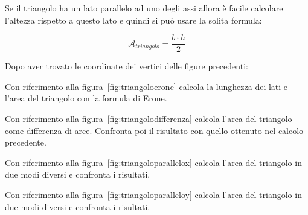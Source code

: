 Se il triangolo ha un lato parallelo ad uno degli assi allora è facile 
calcolare l'altezza rispetto a questo lato e quindi si può usare la 
solita formula:

\[\mathcal{A}_{triangolo} = \frac{b \cdot h}{2}\]

\begin{exrig}
 Dopo aver trovato le coordinate dei vertici delle figure precedenti:

 \begin{esempio}
 \label{ex:D.18}
  Con riferimento alla figura~\ref{fig:triangoloerone} calcola 
  la lunghezza dei lati e l'area del triangolo con la formula di Erone.
 \end{esempio}

 \begin{esempio}
  Con riferimento alla figura~\ref{fig:triangolodifferenza} calcola 
  l'area del triangolo come differenza di aree.
  Confronta poi il risultato con quello ottenuto nel calcolo precedente.
 \end{esempio}

 \begin{esempio}
  Con riferimento alla figura~\ref{fig:triangoloparallelox} calcola 
  l'area del triangolo in due modi diversi e confronta i risultati.
 \end{esempio}

 \begin{esempio}
  Con riferimento alla figura~\ref{fig:triangoloparalleloy} calcola 
  l'area del triangolo in due modi diversi e confronta i risultati.
 \end{esempio}
\end{exrig}

% 
